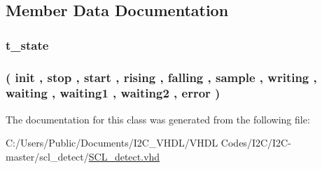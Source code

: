 \subsection{Member Data Documentation}
\subsubsection[{\texorpdfstring{state}{state}}]{ {\bfseries {\bfseries {\bf t\+\_\+state}} \textcolor{vhdlchar}{ }} \hspace{0.3cm}{\ttfamily [Signal]}}\hypertarget{class_s_c_l__detect_1_1fsm_a3faeb1655b4935d9040ff50adfdcd5f0}{}\label{class_s_c_l__detect_1_1fsm_a3faeb1655b4935d9040ff50adfdcd5f0}
\subsubsection[{\texorpdfstring{t\+\_\+state}{t_state}}]{ {\bfseries \textcolor{vhdlchar}{(}\textcolor{vhdlchar}{ }\textcolor{vhdlchar}{init}\textcolor{vhdlchar}{ }\textcolor{vhdlchar}{,}\textcolor{vhdlchar}{ }\textcolor{vhdlchar}{stop}\textcolor{vhdlchar}{ }\textcolor{vhdlchar}{,}\textcolor{vhdlchar}{ }\textcolor{vhdlchar}{start}\textcolor{vhdlchar}{ }\textcolor{vhdlchar}{,}\textcolor{vhdlchar}{ }\textcolor{vhdlchar}{rising}\textcolor{vhdlchar}{ }\textcolor{vhdlchar}{,}\textcolor{vhdlchar}{ }\textcolor{vhdlchar}{falling}\textcolor{vhdlchar}{ }\textcolor{vhdlchar}{,}\textcolor{vhdlchar}{ }\textcolor{vhdlchar}{sample}\textcolor{vhdlchar}{ }\textcolor{vhdlchar}{,}\textcolor{vhdlchar}{ }\textcolor{vhdlchar}{writing}\textcolor{vhdlchar}{ }\textcolor{vhdlchar}{,}\textcolor{vhdlchar}{ }\textcolor{vhdlchar}{waiting}\textcolor{vhdlchar}{ }\textcolor{vhdlchar}{,}\textcolor{vhdlchar}{ }\textcolor{vhdlchar}{waiting1}\textcolor{vhdlchar}{ }\textcolor{vhdlchar}{,}\textcolor{vhdlchar}{ }\textcolor{vhdlchar}{waiting2}\textcolor{vhdlchar}{ }\textcolor{vhdlchar}{,}\textcolor{vhdlchar}{ }\textcolor{vhdlchar}{error}\textcolor{vhdlchar}{ }\textcolor{vhdlchar}{)}\textcolor{vhdlchar}{ }} \hspace{0.3cm}{\ttfamily [Type]}}\hypertarget{class_s_c_l__detect_1_1fsm_a5653729522f0b754a9aa9312cc16b167}{}\label{class_s_c_l__detect_1_1fsm_a5653729522f0b754a9aa9312cc16b167}


The documentation for this class was generated from the following file\+:\begin{DoxyCompactItemize}
\item 
C\+:/\+Users/\+Public/\+Documents/\+I2\+C\+\_\+\+V\+H\+D\+L/\+V\+H\+D\+L Codes/\+I2\+C/\+I2\+C-\/master/scl\+\_\+detect/\hyperlink{_s_c_l__detect_8vhd}{S\+C\+L\+\_\+detect.\+vhd}\end{DoxyCompactItemize}
